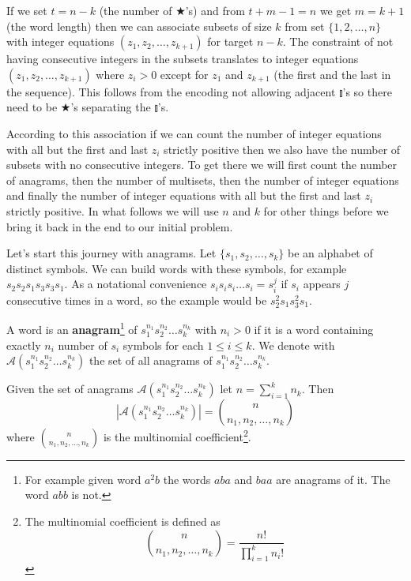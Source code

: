 \begin{lem}\label{consec_ints_association}
If we set $t = n - k$ (the number of $\bigstar$'s) and from $t + m - 1 = n$ we get $m = k + 1$ (the word length) then we can associate subsets of size $k$ from set $\{1, 2, \ldots, n\}$ with integer equations $(z_1, z_2, \ldots, z_{k + 1})$ for target $n - k$. The constraint of not having consecutive integers in the subsets translates to integer equations $(z_1, z_2, \ldots, z_{k + 1})$ where $z_i > 0$ except for $z_1$ and $z_{k + 1}$ (the first and the last in the sequence). This follows from the encoding not allowing adjacent $\talloblong$'s so there need to be $\bigstar$'s separating the $\talloblong$'s.
\end{lem}

According to this association if we can count the number of integer equations with all but the first and last $z_i$ strictly positive then we also have the number of subsets with no consecutive integers. To get there we will first count the number of anagrams, then the number of multisets, then the number of integer equations and finally the number of integer equations with all but the first and last $z_i$ strictly positive. In what follows we will use $n$ and $k$ for other things before we bring it back in the end to our initial problem.

Let's start this journey with anagrams. Let $\{s_1, s_2, \ldots, s_k\}$ be an alphabet of distinct symbols. We can build words with these symbols, for example $s_2s_2s_1s_3s_3s_1$. As a notational convenience $s_is_is_i \ldots s_i=s_i^j$ if $s_i$ appears $j$ consecutive times in a word, so the example would be $s_2^2s_1s_3^2s_1$.

\begin{defn}
A word is an \textbf{anagram}\footnote{For example given word $a^2b$ the words $aba$ and $baa$ are anagrams of it. The word $abb$ is not.} of $s_1^{n_1}s_2^{n_2} \ldots s_k^{n_k}$ with $n_i > 0$ if it is a word containing exactly $n_i$ number of $s_i$ symbols for each $1 \leq i \leq k$. We denote with $\mathcal{A}(s_1^{n_1}s_2^{n_2} \ldots s_k^{n_k})$ the set of all anagrams of $s_1^{n_1}s_2^{n_2} \ldots s_k^{n_k}$.
\end{defn}

\begin{thm}\label{num_anagrams}
Given the set of anagrams $\mathcal{A}(s_1^{n_1}s_2^{n_2} \ldots s_k^{n_k})$  let $n = \sum_{i = 1}^k n_k$. Then
$$
|\mathcal{A}(s_1^{n_1}s_2^{n_2} \ldots s_k^{n_k})| = \binom{n}{n_1,n_2, \ldots, n_k}
$$	
where $\binom{n}{n_1,n_2, \ldots, n_k}$ is the multinomial coefficient\footnote{The multinomial coefficient is defined as
$$
\binom{n}{n_1,n_2, \ldots, n_k} = \frac{n!}{\prod_{i = 1}^k n_i!}
$$}.
\end{thm}


